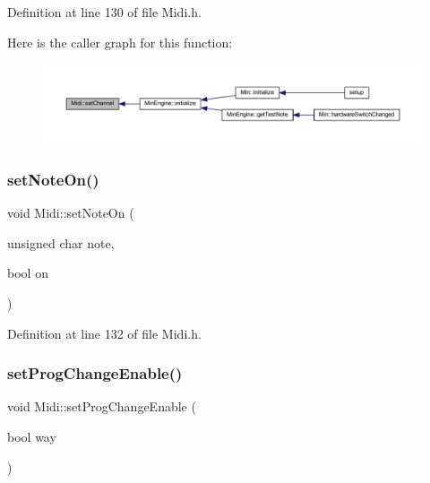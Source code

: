 Definition at line 130 of file Midi.\+h.

Here is the caller graph for this function\+:
\nopagebreak
\begin{figure}[H]
\begin{center}
\leavevmode
\includegraphics[width=350pt]{da/db9/class_midi_ab4278443129bc124d46a9f06723283a6_icgraph}
\end{center}
\end{figure}
\mbox{\label{class_midi_a981761bdfa5f3f9637cdac108d88ba35}} 
\subsubsection{\texorpdfstring{set\+Note\+On()}{setNoteOn()}}
{\footnotesize\ttfamily void Midi\+::set\+Note\+On (\begin{DoxyParamCaption}\item[{unsigned char}]{note,  }\item[{bool}]{on }\end{DoxyParamCaption})\hspace{0.3cm}{\ttfamily [inline]}}



Definition at line 132 of file Midi.\+h.

\mbox{\label{class_midi_adba21f11f8a0f7d835604ba68a9414ab}} 
\subsubsection{\texorpdfstring{set\+Prog\+Change\+Enable()}{setProgChangeEnable()}}
{\footnotesize\ttfamily void Midi\+::set\+Prog\+Change\+Enable (\begin{DoxyParamCaption}\item[{bool}]{way }\end{DoxyParamCaption})\hspace{0.3cm}{\ttfamily [inline]}}



